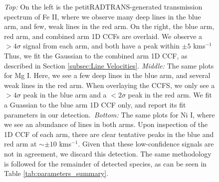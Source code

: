 \documentclass[twocolumn]{aastex631}
\begin{document}
            \begin{figure}
                \centering
                \caption{\textit{Top:} On the left is the petitRADTRANS-generated transmission spectrum of Fe II, where we observe many deep lines in the blue arm, and few, weak lines in the red arm. On the right, the blue arm, red arm, and combined arm 1D CCFs are overlaid. We observe a $>4\sigma$ signal from each arm, and both have a peak within $\pm5$ kms$^{-1}$ Thus, we fit the Gaussian to the combined arm 1D CCF, as described in Section \ref{subsec:Line Velocities}. \textit{Middle:} The same plots for Mg I. Here, we see a few deep lines in the blue arm, and several weak lines in the red arm. When overlaying the CCFS, we only see a $>4\sigma$ peak in the blue arm and a $<2\sigma$ peak in the red arm. We fit a Guassian to the blue arm 1D CCF only, and report its fit parameters in our detection.~\textit{Bottom:} The same plots for Ni I, where we see an abundance of lines in both arms. Upon inspection of the 1D CCF of each arm, there are clear tentative peaks in the blue and red arm at $\sim\pm 10$ kms$^{-1}$. Given that these low-confidence signals are not in agreement, we discard this detection. The same methodology is followed for the remainder of detected species, as can be seen in Table \ref{tab:parameters_summary}.}
                \label{fig:detection-methodology-example}
            \end{figure}
\end{document}
